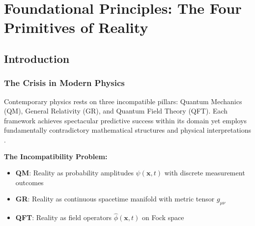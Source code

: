 \chapter{Foundational Principles: The Four Primitives of Reality}

\author{James Tyndall}
\date{December 2025}

\begin{abstract}
We establish the complete foundation of Spatial Displacement Theory (SDT) by defining four fundamental primitives from which all physics emerges: spation (the incompressible medium), displacement (toroidal exclusion structures), shunt dynamics (boundary collisions), and temporal ordering (oscillation counting). Unlike conventional physics which treats mass, charge, and fields as fundamental properties, SDT derives these as emergent consequences of geometric interactions. We present complete $\kappa$-based formulations requiring neither mass parameter $m$ nor gravitational constant $G$, demonstrate geometric recovery of classical mechanics without relativistic frameworks, resolve fundamental paradoxes (measurement problem, singularities, renormalization infinities), and propose three falsifiable experimental tests. This framework eliminates the need for ad-hoc constructs including dark matter, dark energy, MOND modifications, and $\Lambda$CDM parameters, providing a unified geometric foundation spanning atomic to cosmological scales.
\end{abstract}

\section{Introduction}

\subsection{The Crisis in Modern Physics}

Contemporary physics rests on three incompatible pillars: Quantum Mechanics (QM), General Relativity (GR), and Quantum Field Theory (QFT). Each framework achieves spectacular predictive success within its domain yet employs fundamentally contradictory mathematical structures and physical interpretations \cite{weinberg1995quantum, penrose2004road, rovelli2004quantum}.

\textbf{The Incompatibility Problem:}

\begin{itemize}
\item \textbf{QM}: Reality as probability amplitudes $\psi(\mathbf{x},t)$ with discrete measurement outcomes
\item \textbf{GR}: Reality as continuous spacetime manifold with metric tensor $g_{\mu\nu}$
\item \textbf{QFT}: Reality as field operators $\hat{\phi}(\mathbf{x},t)$ on Fock space
\end{itemize}

